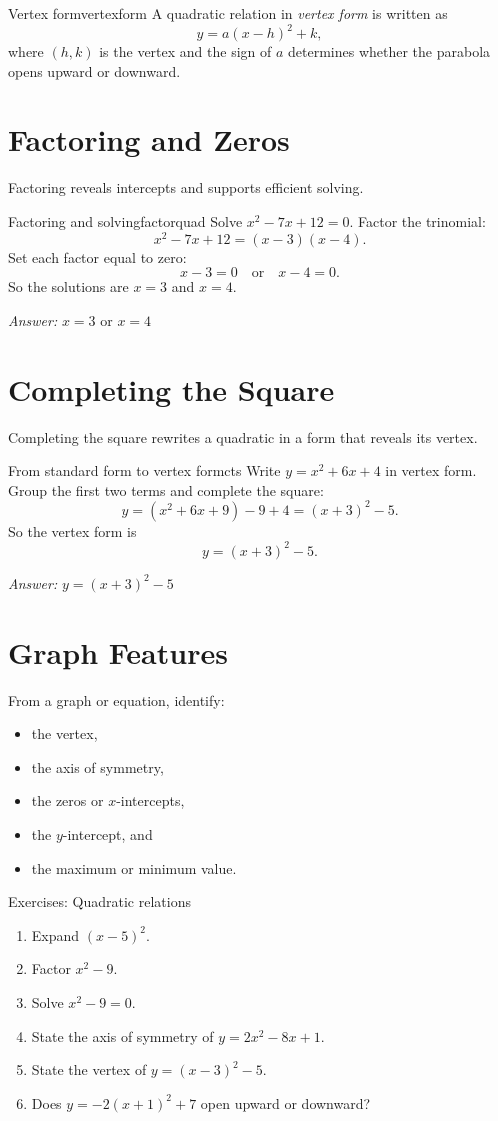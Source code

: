 \documentclass[11pt,oneside]{book}
\newcommand{\answerline}{\par\smallskip\noindent\textit{Answer: }}
\begin{document}
\begin{definition}{Vertex form}{vertexform}
A quadratic relation in \emph{vertex form} is written as
\[
y=a(x-h)^2+k,
\]
where $(h,k)$ is the vertex and the sign of $a$ determines whether the parabola opens upward or downward.
\end{definition}

\section{Factoring and Zeros}
Factoring reveals intercepts and supports efficient solving.

\begin{example}{Factoring and solving}{factorquad}
Solve $x^2-7x+12=0$.
\tcblower
Factor the trinomial:
\[
x^2-7x+12=(x-3)(x-4).
\]
Set each factor equal to zero:
\[
x-3=0 \quad \text{or} \quad x-4=0.
\]
So the solutions are $x=3$ and $x=4$.
\answerline $x=3$ or $x=4$
\end{example}

\section{Completing the Square}
Completing the square rewrites a quadratic in a form that reveals its vertex.

\begin{example}{From standard form to vertex form}{cts}
Write $y=x^2+6x+4$ in vertex form.
\tcblower
Group the first two terms and complete the square:
\[
y=(x^2+6x+9)-9+4=(x+3)^2-5.
\]
So the vertex form is
\[
y=(x+3)^2-5.
\]
\answerline $y=(x+3)^2-5$
\end{example}

\section{Graph Features}
From a graph or equation, identify:
\begin{itemize}
  \item the vertex,
  \item the axis of symmetry,
  \item the zeros or $x$-intercepts,
  \item the $y$-intercept, and
  \item the maximum or minimum value.
\end{itemize}

\begin{exercisebox}{Exercises: Quadratic relations}
\begin{enumerate}
  \item Expand $(x-5)^2$.
  \item Factor $x^2-9$.
  \item Solve $x^2-9=0$.
  \item State the axis of symmetry of $y=2x^2-8x+1$.
  \item State the vertex of $y=(x-3)^2-5$.
  \item Does $y=-2(x+1)^2+7$ open upward or downward?
\end{enumerate}
\end{exercisebox}
\end{document}
